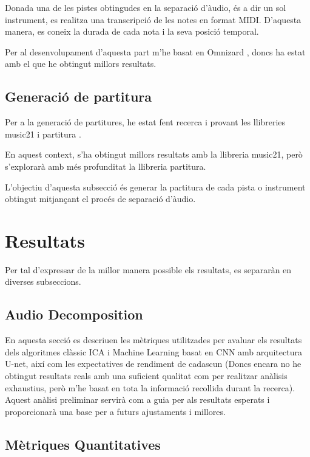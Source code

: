 \documentclass[10pt,a4paper,twocolumn,twoside]{article}
\begin{document}
Donada una de les pistes obtingudes en la separació d'àudio, és a dir un sol instrument, es realitza una transcripció de les notes en format MIDI. D'aquesta manera, es coneix la durada de cada nota i la seva posició temporal. \cite{music-transcription-app132111882} 

Per al desenvolupament d'aquesta part m'he basat en Omnizard \cite{Omnizard-Wu2021}, doncs ha estat amb el que he obtingut millors resultats.


\subsection{Generació de partitura}

Per a la generació de partitures, he estat fent recerca i provant les llibreries music21 \cite{music21-conf/ismir/CuthbertA10} i partitura \cite{partitura_mec}.

En aquest context, s'ha obtingut millors resultats amb la llibreria music21, però s'explorarà amb més profunditat la llibreria partitura.

L'objectiu d'aquesta subsecció és generar la partitura de cada pista o instrument obtingut mitjançant el procés de separació d'àudio.

\section{Resultats}
Per tal d'expressar de la millor manera possible els resultats, es separaràn en diverses subseccions.

\subsection{Audio Decomposition}

En aquesta secció es descriuen les mètriques utilitzades per avaluar els resultats dels algoritmes clàssic ICA i Machine Learning basat en CNN amb arquitectura U-net, així com les expectatives de rendiment de cadascun (Doncs encara no he obtingut resultats reals amb una suficient qualitat com per realitzar anàlisis exhaustius, però m'he basat en tota la informació recollida durant la recerca). Aquest anàlisi preliminar servirà com a guia per als resultats esperats i proporcionarà una base per a futurs ajustaments i millores.

\subsection{Mètriques Quantitatives}
\end{document}
